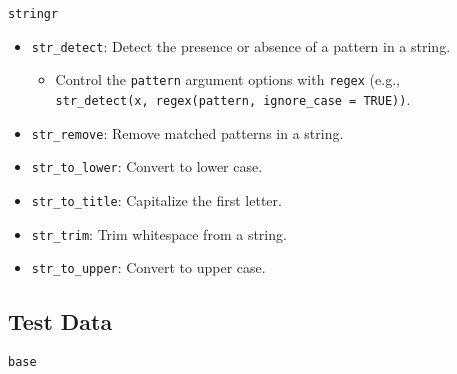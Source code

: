 \documentclass[]{book}
\providecommand{\tightlist}{%
  \setlength{\itemsep}{0pt}\setlength{\parskip}{0pt}}
\begin{document}
\texttt{stringr}

\begin{itemize}
\tightlist
\item
  \texttt{str\_detect}: Detect the presence or absence of a pattern in a string.

  \begin{itemize}
  \tightlist
  \item
    Control the \texttt{pattern} argument options with \texttt{regex} (e.g., \texttt{str\_detect(x,\ regex(pattern,\ ignore\_case\ =\ TRUE))}.
  \end{itemize}
\item
  \texttt{str\_remove}: Remove matched patterns in a string.
\item
  \texttt{str\_to\_lower}: Convert to lower case.
\item
  \texttt{str\_to\_title}: Capitalize the first letter.
\item
  \texttt{str\_trim}: Trim whitespace from a string.
\item
  \texttt{str\_to\_upper}: Convert to upper case.
\end{itemize}

\hypertarget{test-data}{%
\subsection{Test Data}\label{test-data}}

\texttt{base}
\end{document}
